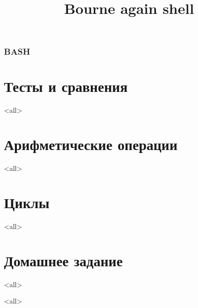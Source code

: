 
\title[bash]{Bourne again shell}




\begin{frame}
	\frametitle{BASH}
	\titlepage
	\vspace{-0.5cm}
	\begin{center}
	\end{center}
\end{frame}

\begin{frame}
	\tableofcontents
	[hideallsubsections]
\end{frame}


\section{Тесты и сравнения}

\mode<all>{}

\section{Арифметические операции}

\mode<all>{}

\section{Циклы}

\mode<all>{}

\section{Домашнее задание}

\mode<all>{}

\mode<all>


